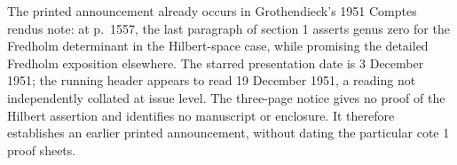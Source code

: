 The printed announcement already occurs in Grothendieck's 1951
Comptes rendus note: at p.~1557, the last paragraph of section 1 asserts
genus zero for the Fredholm determinant in the Hilbert-space case, while
promising the detailed Fredholm exposition elsewhere.
\cite[p.~1557]{algGrothendieckCR1951Tensor}
The starred presentation date is 3 December 1951; the running header appears
to read 19 December 1951, a reading not independently collated at issue level.
The three-page notice gives no proof of the Hilbert assertion and identifies
no manuscript or enclosure. It therefore establishes an earlier printed
announcement, without dating the particular cote 1 proof sheets.
